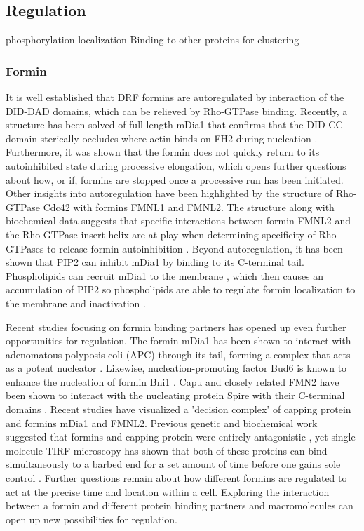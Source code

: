 \subsection{Regulation}\label{ena-formin-regulation}
phosphorylation
localization
Binding to other proteins for clustering

\subsubsection{Formin}

It is well established that DRF formins are autoregulated by interaction of the DID-DAD domains, which can be relieved by Rho-GTPase binding. Recently, a structure has been solved of full-length mDia1 that confirms that the DID-CC domain sterically occludes where actin binds on FH2 during nucleation \citep{maiti_structure_2012}. Furthermore, it was shown that the formin does not quickly return to its autoinhibited state during processive elongation, which opens further questions about how, or if, formins are stopped once a processive run has been initiated. Other insights into autoregulation have been highlighted by the structure of Rho-GTPase Cdc42 with formins FMNL1 and FMNL2. The structure along with biochemical data suggests that specific interactions between formin FMNL2 and the Rho-GTPase insert helix are at play when determining specificity of Rho-GTPases to release formin autoinhibition \citep{kuhn_structure_2015}. Beyond autoregulation, it has been shown that PIP2 can inhibit mDia1 by binding to its C-terminal tail. Phospholipids can recruit mDia1 to the membrane \citep{van_gisbergen_class_2012}, which then causes an accumulation of PIP2 so phospholipids are able to regulate formin localization to the membrane and inactivation \citep{ramalingam_phospholipids_2010}. 

Recent studies focusing on formin binding partners has opened up even further opportunities for regulation. The formin mDia1 has been shown to interact with adenomatous polyposis coli (APC) through its tail, forming a complex that acts as a potent nucleator \citep{breitsprecher_rocket_2012,okada_adenomatous_2010}. Likewise, nucleation-promoting factor Bud6 is known to enhance the nucleation of formin Bni1 \citep{moseley_differential_2005}. Capu and closely related FMN2 have been shown to interact with the nucleating protein Spire with their C-terminal domains \citep{montaville_role_2016,montaville_spire_2014,pechlivanis_identification_2009,vizcarra_structure_2011}. Recent studies have visualized a 'decision complex' of capping protein and formins mDia1 and FMNL2. Previous genetic and biochemical work suggested that formins and capping protein were entirely antagonistic \citep{kovar_profilin-mediated_2005}, yet single-molecule TIRF microscopy has shown that both of these proteins can bind simultaneously to a barbed end for a set amount of time before one gains sole control \citep{bombardier_single-molecule_2015,shekhar_formin_2015}. Further questions remain about how different formins are regulated to act at the precise time and location within a cell. Exploring the interaction between a formin and different protein binding partners and macromolecules can open up new possibilities for regulation.

